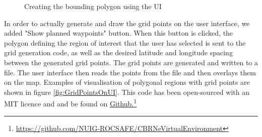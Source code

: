 \begin{figure}{}
\hspace{0.2em}
\hspace{0.2em}
\caption{Creating the bounding polygon using the UI}
\label{fig:AddClicks}
\end{figure}

In order to actually generate and draw the grid points on the user interface, we added "Show planned waypoints" button. When this button is clicked, the polygon defining the region of interest that the user has selected is sent to the grid generation code, as well as the desired latitude and longitude spacing between the generated grid points. The grid points are generated and written to a file. The user interface then reads the points from the file and then overlays them on the map. Examples of visualisation of polygonal regions with grid points are shown in figure \ref{fig:GridPointsOnUI}. This code has been open-sourced with an MIT licence and and be found on 
\href{https://github.com/NUIG-ROCSAFE/CBRNeVirtualEnvironment}{ Github.}\footnote{\href {https://github.com/NUIG-ROCSAFE/CBRNeVirtualEnvironment}{https://github.com/NUIG-ROCSAFE/CBRNeVirtualEnvironment}}

